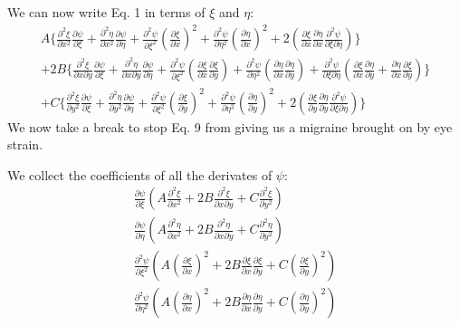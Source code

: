 \documentclass[a4paper,10pt]{article}
\begin{document}
We can now write Eq. 1 in terms of $\xi$ and $\eta$:
\begin{multline}
 A\{\frac{\partial ^2 \xi}{\partial x^2}\frac{\partial \psi}{\partial \xi}+\frac{\partial ^2 \eta}{\partial x^2}
\frac{\partial \psi}{\partial \eta}
+\frac{\partial ^2 \psi}{\partial \xi ^2}(\frac{\partial \xi}{\partial x})^2+\frac{\partial ^2 \psi}{\partial \eta ^2}(\frac{\partial \eta}{\partial x})^2
+2(\frac{\partial \xi}{\partial x}\frac{\partial \eta}{\partial x}\frac{\partial ^2 \psi}{\partial \xi \partial \eta})\}\\
+2B\{\frac{\partial ^2\xi}{\partial x \partial y}\frac{\partial \psi}{\partial \xi}
 +\frac{\partial ^2 \eta}{\partial x \partial y}\frac{\partial \psi}{\partial \eta}
 +\frac{\partial^2 \psi}{\partial \xi ^2}(\frac{\partial \xi}{\partial x}\frac{\partial \xi}{\partial y})
 +\frac{\partial^2 \psi}{\partial \eta ^2}(\frac{\partial \eta}{\partial x}\frac{\partial \eta}{\partial y})
 +\frac{\partial ^2 \psi}{\partial \xi \partial \eta}(\frac{\partial \xi}{\partial x}\frac{\partial \eta}{\partial y}+\frac{\partial \eta}{\partial x}\frac{\partial \xi}{\partial y} ) \}\\
 +C\{\frac{\partial ^2 \xi}{\partial y^2}\frac{\partial \psi}{\partial \xi}+\frac{\partial ^2 \eta}{\partial y^2}\frac{\partial \psi}{\partial \eta}
+\frac{\partial ^2 \psi}{\partial \xi ^2}(\frac{\partial \xi}{\partial y})^2+\frac{\partial ^2 \psi}{\partial \eta ^2}(\frac{\partial \eta}{\partial y})^2
+2(\frac{\partial \xi}{\partial y}\frac{\partial \eta}{\partial y}\frac{\partial ^2 \psi}{\partial \xi \partial \eta}) \}
\end{multline}
We now take a break to stop Eq. 9 from giving us a migraine brought on by eye strain.

We collect the coefficients of all the derivates of $\psi$:
\begin{gather*}
\frac{\partial \psi}{\partial \xi}(A\frac{\partial ^2 \xi}{\partial x^2}+2B\frac{\partial ^2 \xi}{\partial x \partial y}+C\frac{\partial ^2 \xi}{\partial y^2})\\
\frac{\partial \psi}{\partial \eta}(A\frac{\partial ^2 \eta}{\partial x^2}+2B\frac{\partial ^2 \eta}{\partial x \partial y}+C\frac{\partial ^2 \eta}{\partial y^2})\\
\frac{\partial ^2 \psi}{\partial \xi ^2}(A(\frac{\partial \xi}{\partial x})^2+2B\frac{\partial \xi}{\partial x}\frac{\partial \xi}{\partial y}+C(\frac{\partial \xi}{\partial y})^2)\\
\frac{\partial ^2 \psi}{\partial \eta ^2}(A(\frac{\partial \eta}{\partial x})^2+2B\frac{\partial \eta}{\partial x}\frac{\partial \eta}{\partial y}+C(\frac{\partial \eta}{\partial y})^2)\\
\end{gather*}
\end{document}
